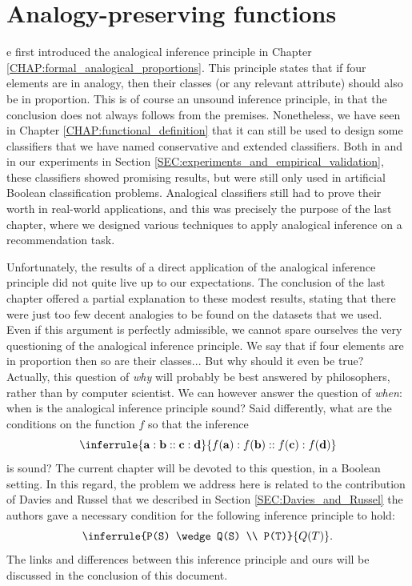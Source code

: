\chapter{Analogy-preserving functions}
\label{CHAP:analogy_preserving_functions}

e first introduced the analogical inference principle in Chapter
\ref{CHAP:formal_analogical_proportions}. This principle states that if four
elements are in analogy, then their classes (or any relevant attribute) should
also be in proportion. This is of course an unsound inference principle, in
that the conclusion does not always follows from the premises. Nonetheless, we
have seen in Chapter \ref{CHAP:functional_definition} that it can still be used
to design some classifiers that we have named conservative and extended
classifiers.  Both in \cite{BayMicDelIJCAI07} and in our experiments in Section
\ref{SEC:experiments_and_empirical_validation}, these classifiers
showed promising results, but were still only used in artificial Boolean
classification problems. Analogical classifiers still had to prove their worth
in real-world applications, and this was precisely the purpose of the last
chapter, where we designed various techniques to apply analogical inference on
a recommendation task.

Unfortunately, the results of a direct application of the analogical inference
principle did not quite live up to our expectations. The conclusion of the last
chapter offered a partial explanation to these modest results, stating that
there were just too few decent analogies to be found on the datasets that we
used. Even if this argument is perfectly admissible, we cannot spare ourselves
the very questioning of the analogical inference principle. We say that if
four elements are in proportion then so are their classes... But why should it
even be true? Actually, this question of \textit{why} will probably be best
answered by philosophers, rather than by computer scientist. We can however
answer the question of \textit{when}: when is the analogical inference
principle sound? Said differently, what are the conditions on the function $f$
so that the inference
$$
\inferrule{\mathbf{a} : \mathbf{b} :: \mathbf{c} : \mathbf{d}}{ f(\mathbf{a}) :
f(\mathbf{b}) :: f(\mathbf{c}) : f(\mathbf{d})}
$$
is sound? The current chapter will be devoted to this question, in a Boolean
setting. In this regard,
the problem we address here is related to the contribution of Davies and Russel
that we described in Section \ref{SEC:Davies_and_Russel} the authors gave a
necessary condition for the following inference principle to hold:
$$\inferrule{P(S) \wedge Q(S) \\ P(T)}{Q(T)}.$$
The links and differences between this inference principle and ours will be
discussed in the conclusion of this document.

